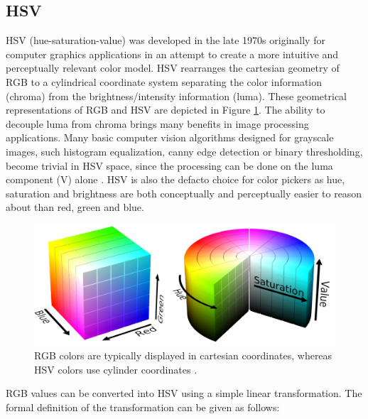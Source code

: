 \documentclass[thesis.tex]{subfiles}
\begin{document}
\subsection{HSV}

HSV (hue-saturation-value) was developed in the late 1970s originally for computer graphics applications in an attempt to create a more intuitive and perceptually relevant color model. HSV rearranges the cartesian geometry of RGB to a cylindrical coordinate system separating the color information (chroma) from the brightness/intensity information (luma). These geometrical representations of RGB and HSV are depicted in Figure \ref{figure:rgb_hsv}. The ability to decouple luma from chroma brings many benefits in image processing applications. Many basic computer vision algorithms designed for grayscale images, such histogram equalization, canny edge detection or binary thresholding, become trivial in HSV space, since the processing can be done on the luma component (V) alone \cite{color_segmentation}. HSV is also the defacto choice for color pickers as hue, saturation and brightness are both conceptually and perceptually easier to reason about than red, green and blue.

\begin{figure}[ht]
\centering \includegraphics[width=13.25cm]{images/rgb_hsv}
\caption{RGB colors are typically displayed in cartesian coordinates, whereas HSV colors use cylinder coordinates \cite{hsv_cylinder} \cite{rgb_cube}.\label{figure:rgb_hsv}}
\end{figure}

RGB values can be converted into HSV using a simple linear transformation. The formal definition of the transformation can be given as follows:
\end{document}
